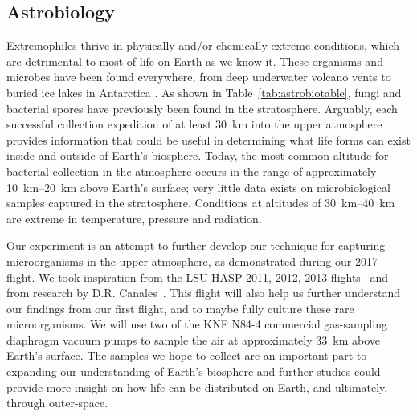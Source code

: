 \subsection{Astrobiology}
\label{sec:Astrobiology-Background}

Extremophiles thrive in physically and/or chemically extreme conditions, which are detrimental to most of life on Earth as we know it. These organisms and microbes have been found everywhere, from deep underwater volcano vents to buried ice lakes in Antarctica \cite{Extremophiles}.  As shown in Table~\ref{tab:astrobiotable}, fungi and bacterial spores have previously been found in the stratosphere. Arguably, each successful collection expedition of at least \SI{30}{\kilo\meter} into the upper atmosphere provides information that could be useful in determining what life forms can exist inside and outside of Earth's biosphere. Today, the most common altitude for bacterial collection in the atmosphere occurs in the range of approximately \SIrange{10}{20}{\kilo\meter} above Earth's surface; very little data exists on microbiological samples captured in the stratosphere. Conditions at altitudes of \SIrange{30}{40}{\kilo\meter} are extreme in temperature, pressure and radiation. 

	




Our experiment is an attempt to further develop our technique for capturing microorganisms in the upper atmosphere, as demonstrated during our 2017~\cite{SORA} flight.  We took inspiration from the LSU HASP 2011, 2012, 2013 flights~\cite{LSU} and from research by D.R. Canales~\cite{canales}.  This flight will also help us further understand our findings from our first flight, and to maybe fully culture these rare microorganisms. We will use two of the KNF N84-4 commercial gas-sampling diaphragm vacuum pumps to sample the air at approximately \SI{33}{\kilo\meter} above Earth's surface. The samples we hope to collect are an important part to expanding our understanding of Earth's biosphere and further studies could provide more insight on how life can be distributed on Earth, and ultimately, through outer-space.

